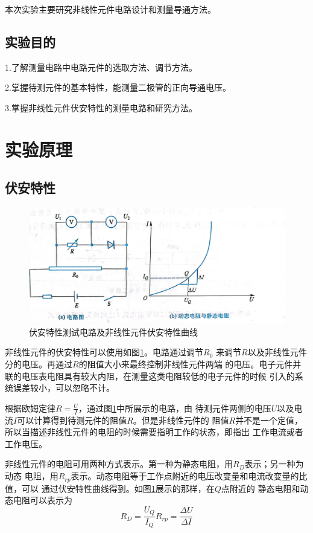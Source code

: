 \documentclass{ctexart}
\begin{document}
  本次实验主要研究非线性元件电路设计和测量导通方法。

  \subsection{实验目的}
  1.\quad 了解测量电路中电路元件的选取方法、调节方法。

  2.\quad 掌握待测元件的基本特性，能测量二极管的正向导通电压。
  
  3.\quad 掌握非线性元件伏安特性的测量电路和研究方法。

\section{实验原理}
  \subsection{伏安特性}
  \begin{figure}[t]
    \centering
    \includegraphics[width=1\textwidth]{fuantexingdianlu.jpg}
    \caption{伏安特性测试电路及非线性元件伏安特性曲线}\label{fuantexingdianlu}
  \end{figure}
  非线性元件的伏安特性可以使用如图\ref{fuantexingdianlu}。电路通过调节$R_{0}$
  来调节$R$以及非线性元件分的电压。再通过$R$的阻值大小来最终控制非线性元件两端
  的电压。电子元件并联的电压表电阻具有较大内阻，在测量这类电阻较低的电子元件的时候
  引入的系统误差较小，可以忽略不计。

  根据欧姆定律$R=\frac{U}{I}$，通过图\ref{fuantexingdianlu}中所展示的电路，由
  待测元件两侧的电压$U$以及电流$I$可以计算得到待测元件的阻值$R$。但是非线性元件的
  阻值$R$并不是一个定值，所以当描述非线性元件的电阻的时候需要指明工作的状态，即指出
  工作电流或者工作电压。

  非线性元件的电阻可用两种方式表示。第一种为静态电阻，用$R_{D}$表示；另一种为动态
  电阻，用$R_{rp}$表示。动态电阻等于工作点附近的电压改变量和电流改变量的比值，可以
  通过伏安特性曲线得到。如图\ref{fuantexingdianlu}展示的那样，在$Q$点附近的
  静态电阻和动态电阻可以表示为
  \begin{equation}
    R_{D}=\frac{U_{Q}}{I_{Q}}

    R_{rp}=\frac{\Delta U}{\Delta I}
  \end{equation}
\end{document}
